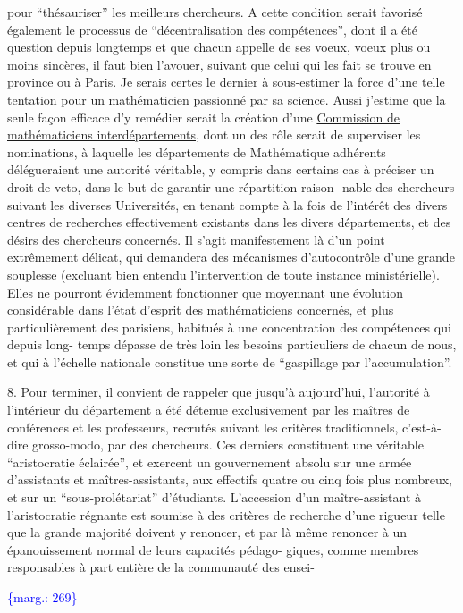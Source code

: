 \documentclass[11pt]{article}
\newcommand{\margin}[1]{\textcolor{blue}{\{\textsf{marg.:} #1\}}}
\newcommand{\uline}[1]{\underline{#1}}
\begin{document}
pour ``thésauriser'' les meilleurs chercheurs. A cette condition serait favorisé
également le processus de ``décentralisation des compétences'', dont il a été
question depuis longtemps et que chacun appelle de ses voeux, voeux plus ou
moins sincères, il faut bien l'avouer, suivant que celui qui les fait se trouve
en province ou à Paris. Je serais certes le dernier à sous-estimer la force
d'une telle tentation pour un mathématicien passionné par sa science. Aussi
j'estime que la seule façon efficace d'y remédier serait la création d'une
\uline{Commission de mathématiciens interdépartements}, dont un des rôle serait de
superviser les nominations, à laquelle les départements de Mathématique
adhérents délégueraient une autorité véritable, y compris dans certains cas
à préciser un droit de veto, dans le but de garantir une répartition raison-%
nable des chercheurs suivant les diverses Universités, en tenant compte à la
fois de l'intérêt des divers centres de recherches effectivement existants dans
les divers départements, et des désirs des chercheurs concernés. Il s'agit
manifestement là d'un point extrêmement délicat, qui demandera des mécanismes
d'autocontrôle d'une grande souplesse (excluant bien entendu l'intervention
de toute instance ministérielle). Elles ne pourront évidemment fonctionner
\hfill que moyennant une évolution considérable
dans l'état d'esprit des mathématiciens concernés, et plus particulièrement
des parisiens, habitués à une concentration des compétences qui depuis long-%
temps dépasse de très loin les besoins particuliers de chacun de nous, et qui
à l'échelle nationale constitue une sorte de ``gaspillage par l'accumulation''.

8. Pour terminer, il convient de rappeler que jusqu'à aujourd'hui, l'autorité
à l'intérieur du département a été détenue exclusivement par les maîtres de
conférences et les professeurs, recrutés suivant les critères traditionnels,
c'est-à-dire grosso-modo, par des chercheurs. Ces derniers constituent une
véritable ``aristocratie éclairée'', et exercent un gouvernement absolu sur
une armée d'assistants et maîtres-assistants, aux effectifs quatre ou cinq
fois plus nombreux, et sur un ``sous-prolétariat'' d'étudiants. L'accession
d'un maître-assistant à l'aristocratie régnante est soumise à des critères
de recherche d'une rigueur telle que la grande majorité doivent y renoncer,
et par là même renoncer à un épanouissement normal de leurs capacités pédago-%
giques, comme membres responsables à part entière de la communauté des ensei-%

\margin{269}
\end{document}
